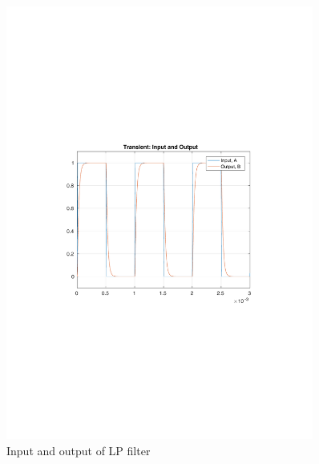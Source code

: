 \documentclass[12pt,a4paper,UKenglish]{article}
\begin{document}
\begin{figure} [H]
  \centering 
  \includegraphics[width=0.9\textwidth]{img/2c_tran.pdf} 
  \caption{Input and output of LP filter}
  \label{tran_tuned} 
\end{figure}
\end{document}
